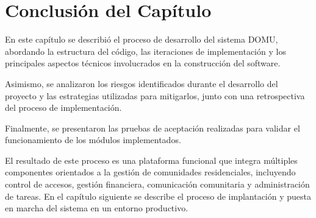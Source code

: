 \section{Conclusión del Capítulo}

En este capítulo se describió el proceso de desarrollo del sistema DOMU, abordando la estructura del código, las iteraciones de implementación y los principales aspectos técnicos involucrados en la construcción del software.

Asimismo, se analizaron los riesgos identificados durante el desarrollo del proyecto y las estrategias utilizadas para mitigarlos, junto con una retrospectiva del proceso de implementación.

Finalmente, se presentaron las pruebas de aceptación realizadas para validar el funcionamiento de los módulos implementados.

El resultado de este proceso es una plataforma funcional que integra múltiples componentes orientados a la gestión de comunidades residenciales, incluyendo control de accesos, gestión financiera, comunicación comunitaria y administración de tareas. 
En el capítulo siguiente se describe el proceso de implantación y puesta en marcha del sistema en un entorno productivo.